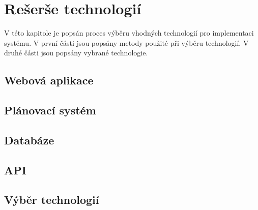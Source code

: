 \chapter{Rešerše technologií}

V této kapitole je popsán proces výběru vhodných technologií pro implementaci systému. V první části jsou popsány metody použité při výběru technologií. V druhé části jsou popsány vybrané technologie.

\section{Webová aplikace}

\section{Plánovací systém}

\section{Databáze}

\section{API}

\section{Výběr technologií}
